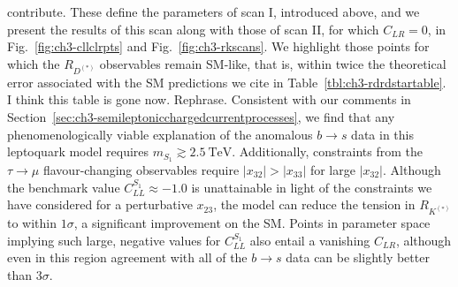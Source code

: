 contribute. These define the parameters of scan I, introduced above, and we
present the results of this scan along with those of scan II, for which
$C_{LR} = 0$, in Fig.~\ref{fig:ch3-cllclrpts} and Fig.~\ref{fig:ch3-rkscans}. We
highlight those points for which the $R_{D^{(*)}}$ observables remain SM-like,
that is, within twice the theoretical error associated with the SM predictions
we cite in Table~\ref{tbl:ch3-rdrdstartable}. {\color{red}I think this table is
  gone now. Rephrase.} Consistent with our comments in
Section~\ref{sec:ch3-semileptonicchargedcurrentprocesses}, we find that any
phenomenologically viable explanation of the anomalous $b \to s$ data in this
leptoquark model requires $m_{S_{1}} \gtrsim \SI{2.5}{\TeV}$. Additionally,
constraints from the $\tau \to \mu$ flavour-changing observables require
$|x_{32}| > |x_{33}|$ for large $|x_{32}|$. Although the benchmark value
$C_{LL}^{S_{1}} \approx -1.0$ is unattainable in light of the constraints we
have considered for a perturbative $x_{23}$, the model can reduce the tension in
$R_{K^{(*)}}$ to within $1 \sigma$, a significant improvement on the SM. Points
in parameter space implying such large, negative values for $C_{LL}^{S_{1}}$
also entail a vanishing $C_{LR}$, although even in this region agreement with
all of the $b \to s$ data can be slightly better than $3\sigma$.

